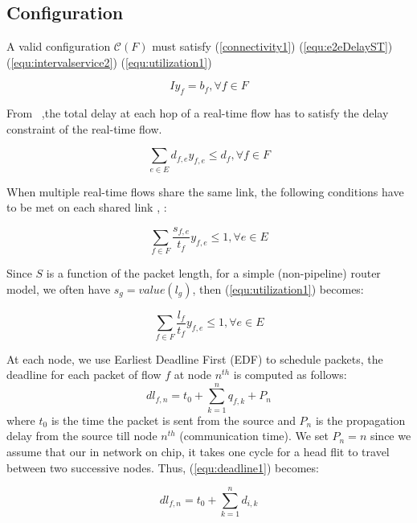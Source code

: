 \documentclass[conference, twocolumn]{IEEEtran}
\theoremstyle{definition}
\begin{document}
\subsection{Configuration}
A valid configuration $\mathcal{C}(F)$ must satisfy (\ref{connectivity1}) 
(\ref{equ:e2eDelayST}) (\ref{equ:intervalservice2}) (\ref{equ:utilization1})

\begin{equation}\label{connectivity1} Iy_f=b_f,\forall f \in F
\end{equation}

From ~\cite{Ferrari90ascheme},the total delay at each hop of a real-time flow
has to satisfy the delay constraint of the real-time flow.

\begin{equation}\label{equ:e2eDelayST}
\sum_{e \in E}d_{f,e}y_{f,e} \leq d_f, \forall f \in F
\end{equation}

When multiple real-time flows share the same link, the following conditions
 have to be met on each shared link \cite{Ferrari90ascheme},
 \cite{VermaJitter91}:

\begin{equation}\label{equ:utilization1}
\sum_{f \in F}\frac{s_{f,e}}{t_f}y_{f,e} \leq 1, \forall e \in E
\end{equation}

Since $S$ is a function of the packet length, for a simple (non-pipeline) router
model, we often have $s_g=value(l_g)$, then (\ref{equ:utilization1}) becomes:

\begin{equation}\label{equ:utilization2}
\sum_{f \in F}\frac{l_f}{t_f}y_{f,e} \leq 1, \forall e \in E
\end{equation}

At each node, we use Earliest Deadline First (EDF) \cite{VermaJitter91} 
to schedule packets, the deadline for each packet of flow $f$ at node $n^{th}$
is computed as follows: 
\begin{equation}\label{equ:deadline1}
dl_{f,n}=t_0 + \sum_{k=1}^{n}q_{f,k}+P_n
\end{equation}
where $t_0$ is the time the packet is sent from the source and $P_n$ is the propagation
delay from the source till node $n^{th}$ (communication time). We set
$P_n=n$ since we assume that our in network on chip, it takes one cycle for a
head flit to travel between two successive nodes. Thus, (\ref{equ:deadline1}) becomes:

\begin{equation}\label{equ:deadline2}
dl_{f,n}=t_0 + \sum_{k=1}^{n}d_{i,k}
\end{equation}
\end{document}
